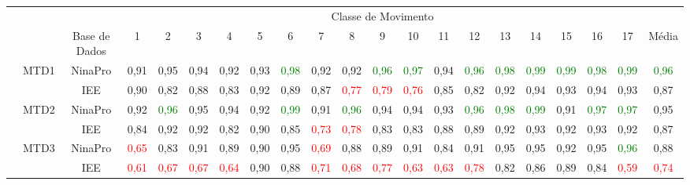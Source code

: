 \begin{sidewaystable}[htb]
	\captionsetup{justification=centering}
	{
		\begin{tabular}{cc|c|ccccccccccccccccc|c}
			\toprule
			&&&	\multicolumn{17}{c}{Classe de Movimento} &\\
			&& Base de Dados & 1&2&3&4&5&6&7&8&9&10&11&12&13&14&15&16&17&Média\\
			\midrule \midrule
			\multirow{8}{*}{\rotatebox{90}{Método}}
			& \multirow{2}{*}{MTD1}	& NinaPro	&0,91&	0,95&	0,94&	0,92&	0,93&		\textcolor{green}{0,98}&	0,92&	0,92&		\textcolor{green}{0,96}&		\textcolor{green}{0,97}&	0,94&		\textcolor{green}{0,96}&		\textcolor{green}{0,98}&		\textcolor{green}{0,99}&		\textcolor{green}{0,99}&		\textcolor{green}{0,98}&		\textcolor{green}{0,99}&		\textcolor{green}{0,96}\\
			&						& IEE		&0,90	&0,82	&0,88	&0,83	&0,92	&0,89	&0,87	&	\textcolor{red}{0,77}	&	\textcolor{red}{0,79}	&	\textcolor{red}{0,76}	&0,85	&0,82	&0,92	&0,94	&0,93	&0,94	&0,93	&0,87\\
			\cline{2-21}                                                                                                                                                             
			& \multirow{2}{*}{MTD2}	& NinaPro	&0,92&		\textcolor{green}{0,96}&	0,95&	0,94&	0,92&		\textcolor{green}{0,99}&	0,91&		\textcolor{green}{0,96}&	0,94&	0,94&	0,93&		\textcolor{green}{0,96}&		\textcolor{green}{0,98}&		\textcolor{green}{0,99}&	0,91&		\textcolor{green}{0,97}&		\textcolor{green}{0,97}&	0,95\\
			&						& IEE		&0,84	&0,92	&0,92	&0,82	&0,90	&0,85	&	\textcolor{red}{0,73}	&	\textcolor{red}{0,78}	&0,83	&0,83	&0,88	&0,89	&0,92	&0,93	&0,92	&0,93	&0,92	&0,87\\
			\cline{2-21}                                                                                                                                                             
			& \multirow{2}{*}{MTD3}	& NinaPro	&\textcolor{red}{0,65}&	0,83&	0,91&	0,89&	0,90&	0,95&	\textcolor{red}{0,69}&	0,88&	0,89&	0,91&	0,84&	0,91&	0,95&	0,95&	0,92&	0,95&		\textcolor{green}{0,96}&	0,88\\
			&						& IEE		&\textcolor{red}{0,61}	&\textcolor{red}{0,67}	&\textcolor{red}{0,67}	&\textcolor{red}{0,64}	&0,90	&0,88	&	\textcolor{red}{0,71}	&\textcolor{red}{0,68}	&	\textcolor{red}{0,77}	&\textcolor{red}{0,63}	&\textcolor{red}{0,63}	&	\textcolor{red}{0,78}	&0,82	&0,86	&0,89	&0,84	&\textcolor{red}{0,59}	&	\textcolor{red}{0,74}\\

\end{tabular}}
\end{sidewaystable}
